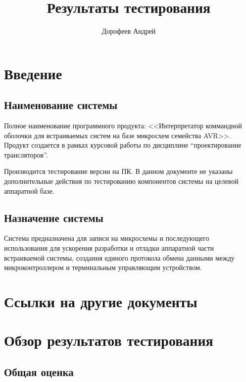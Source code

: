 \documentclass[a4paper, 12pt]{article}
\begin{document}
\author{Дорофеев Андрей}
\title{Результаты тестирования}
\section{Введение}

\subsection{Наименование системы} %

Полное наименование программного продукта: <<Интерпретатор коммандной оболочки для встраиваемых систем на базе 
микросхем семейства AVR>>. Продукт создается в рамках курсовой работы по дисциплине ``проектирование трансляторов''.

Производится тестирование версии на ПК. В данном документе не указаны 
дополнительные действия по тестированию компонентов системы на целевой аппаратной базе.


\subsection{Назначение системы} %

Система предназначена для записи на микросхемы и последующего использования
для ускорения разработки и отладки аппаратной части встраиваемой системы, создания 
единого протокола обмена данными между микроконтроллером и терминальным управляющим
устройством.



\section{Ссылки на другие документы}


\section{Обзор результатов тестирования}

\subsection{Общая оценка} %
\end{document}
